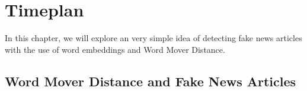 \chapter{Timeplan}
\label{cha:timeplan}

In this chapter, we will explore an very simple idea of detecting fake news articles with the use of word embeddings and Word Mover Distance.
\section{Word Mover Distance and Fake News Articles}
